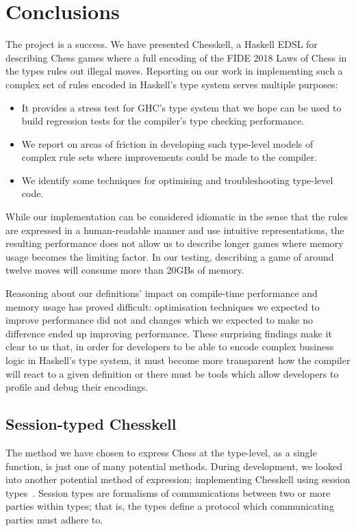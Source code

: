 \chapter{Conclusions}

The project is a success. We have presented Chesskell, a Haskell EDSL for describing Chess games where a full encoding of the FIDE 2018 Laws of Chess in the types rules out illegal moves. Reporting on our work in implementing such a complex set of rules encoded in Haskell's type system serves multiple purposes:

\begin{itemize}
    \item It provides a stress test for GHC's type system that we hope can be used to build regression tests for the compiler's type checking performance.
    \item We report on areas of friction in developing such type-level models of complex rule sets where improvements could be made to the compiler.
    \item We identify some techniques for optimising and troubleshooting type-level code.
\end{itemize}


While our implementation can be considered idiomatic in the sense that the rules are expressed in a human-readable manner and use intuitive representations, the resulting performance does not allow us to describe longer games where memory usage becomes the limiting factor. In our testing, describing a game of around twelve moves will consume more than 20GBs of memory.

Reasoning about our definitions' impact on compile-time performance and memory usage has proved difficult: optimisation techniques we expected to improve performance did not and changes which we expected to make no difference ended up improving performance. These surprising findings make it clear to us that, in order for developers to be able to encode complex business logic in Haskell's type system, it must become more transparent how the compiler will react to a given definition or there must be tools which allow developers to profile and debug their encodings.

\section{Session-typed Chesskell}

The method we have chosen to express Chess at the type-level, as a single function, is just one of many potential methods. During development, we looked into another potential method of expression; implementing Chesskell using session types~\cite{torinosessions}. Session types are formalisms of communications between two or more parties within types; that is, the types define a protocol which communicating parties must adhere to.

